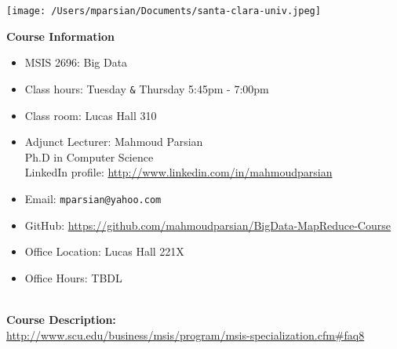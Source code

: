 \documentclass[11pt]{article}
\begin{document}
\texttt{[image: /Users/mparsian/Documents/santa-clara-univ.jpeg]} 
\bigskip
\vspace{10mm}

\textbf {\LARGE Course Information}
\begin{itemize}
	\item MSIS 2696: Big Data
	\item Class hours: Tuesday \verb#&#  Thursday 5:45pm - 7:00pm
	\item Class room: Lucas Hall 310 
	\item Adjunct Lecturer: Mahmoud Parsian \\
	Ph.D in Computer Science \\
	LinkedIn profile: \url{http://www.linkedin.com/in/mahmoudparsian}
	\item Email: \verb#mparsian@yahoo.com# 
	\item GitHub: \url{https://github.com/mahmoudparsian/BigData-MapReduce-Course} 
	\item Office Location: Lucas Hall 221X
	\item Office Hours: TBDL 
\end{itemize}

\vspace{5mm}

\textbf {\large \\ Course Description:} \\
\url{http://www.scu.edu/business/msis/program/msis-specialization.cfm#faq8}

\vspace{5mm}
\end{document}
